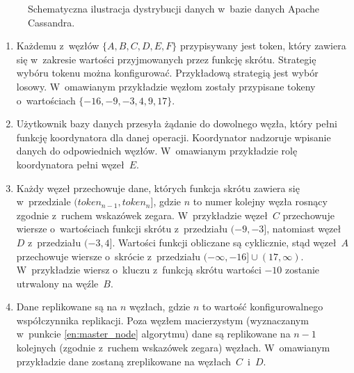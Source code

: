 \begin{figure}[ht!]
	\centering
	

	\caption{Schematyczna ilustracja dystrybucji danych w~bazie danych Apache Cassandra.}
	\label{fig:data_distribution}
\end{figure}

\begin{enumerate}
	\item Każdemu z~węzłów $\{A, B, C, D, E, F\}$ przypisywany jest token, który zawiera się w~zakresie wartości przyjmowanych przez funkcję skrótu. Strategię wybóru tokenu można konfigurować. Przykładową strategią jest wybór losowy. W~omawianym przykładzie węzłom zostały przypisane tokeny o~wartościach $\{-16, -9, -3, 4, 9, 17\}$.
	\item Użytkownik bazy danych przesyła żądanie do dowolnego węzła, który pełni funkcję koordynatora dla danej operacji. Koordynator nadzoruje wpisanie danych do odpowiednich węzłów. W~omawianym przykładzie rolę koordynatora pełni węzeł~$E$.
	\item \label{en:master_node} Każdy węzeł przechowuje dane, których funkcja skrótu zawiera się w~przedziale $(token_{n-1}, token_{n}]$, gdzie $n$ to numer kolejny węzła rosnący zgodnie z~ruchem wskazówek zegara. W~przykładzie węzeł~$C$ przechowuje wiersze o~wartościach funkcji skrótu z~przedziału $(-9, -3]$, natomiast węzeł~$D$ z~przedziału $(-3, 4]$. Wartości funkcji obliczane są cyklicznie, stąd węzeł~$A$ przechowuje wiersze o~skrócie z~przedziału $(-\infty, -16] \cup (17, \infty)$. W~przykładzie wiersz o~kluczu z~funkcją skrótu wartości $-10$ zostanie utrwalony na węźle~$B$.
	\item Dane replikowane są na $n$ węzłach, gdzie $n$ to wartość konfigurowalnego współczynnika replikacji. Poza węzłem macierzystym (wyznaczanym w~punkcie \ref{en:master_node} algorytmu) dane są replikowane na $n - 1$ kolejnych (zgodnie z~ruchem wskazówek zegara) węzłach. W~omawianym przykładzie dane zostaną zreplikowane na węzłach~$C$~i~$D$.
\end{enumerate}

